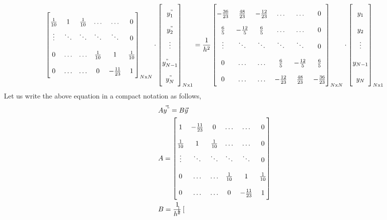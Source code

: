 \documentclass[letterpaper]{exam}
\begin{document}
\begin{questions}
\begin{parts}
\begin{solution}
\begin{align}
\begin{bmatrix}
    \frac{1}{10}&1&\frac{1}{10}&\ldots&\ldots&0\\
    \vdots&\ddots&\ddots&\ddots&\ddots&0\\
    0&\ldots&\ldots&\frac{1}{10}&1&\frac{1}{10}\\
    0&\ldots&\ldots&0&-\frac{11}{23}&1
    \end{bmatrix}_{N\text{x}N}\cdot \begin{bmatrix}
    y^{"}_1\\
    y^{"}_2\\
    \vdots\\
    y^{"}_{N-1}\\
    y^{"}_{N}\\
    \end{bmatrix}_{N\text{x}1} = \frac{1}{h^2}\begin{bmatrix}
    -\frac{36}{23}&\frac{48}{23}&-\frac{12}{23}&\ldots&\ldots&0\\
    \frac{6}{5}&-\frac{12}{5}&\frac{6}{5}&\ldots&\ldots&0\\
    \vdots&\ddots&\ddots&\ddots&\ddots&0\\
    0&\ldots&\ldots&\frac{6}{5}&-\frac{12}{5}&\frac{6}{5}\\
    0&\ldots&\ldots&-\frac{12}{23}&\frac{48}{23}&-\frac{36}{23}
    \end{bmatrix}_{N\text{x}N}\cdot \begin{bmatrix}
    y_1\\
    y_2\\
    \vdots\\
    y_{N-1}\\
    y_{N}\\
    \end{bmatrix}_{N\text{x}1} 
\end{align}
Let us write the above equation in a compact notation as follows,
\begin{align*}
    &A\vec{y^{"}} = B\vec{y}\\
    &A =  \renewcommand{\arraystretch}{2}\begin{bmatrix}
    1&-\frac{11}{23}&0&\ldots&\ldots&0\\
    \frac{1}{10}&1&\frac{1}{10}&\ldots&\ldots&0\\
    \vdots&\ddots&\ddots&\ddots&\ddots&0\\
    0&\ldots&\ldots&\frac{1}{10}&1&\frac{1}{10}\\
    0&\ldots&\ldots&0&-\frac{11}{23}&1
    \end{bmatrix}\\
    &B = \renewcommand{\arraystretch}{2}\frac{1}{h^2}\begin{bmatrix}

\end{bmatrix}
\end{align*}
\end{solution}
\end{parts}
\end{questions}
\end{document}
